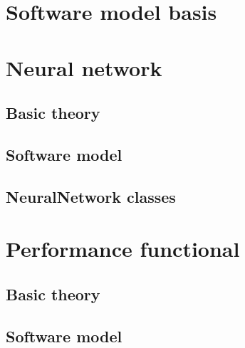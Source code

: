 \documentclass[pdftex, a4paper, 10pt]{book}
\begin{document}

\chapter{Software model basis}\label{SoftwareModelBasis}



\chapter{Neural network}\label{NeuralNetwork}


\section{Basic theory}\label{NeuralNetworkBasicTheory}


\section{Software model}\label{NeuralNetworkSoftwareModel}


\section{NeuralNetwork classes}\label{NeuralNetworkClassese}


 
\chapter{Performance functional}\label{PerformanceFunctional}


\section{Basic theory}\label{PerformanceFunctionalBasicTheory}


\section{Software model}\label{PerformanceFunctionalModel}

\end{document}
